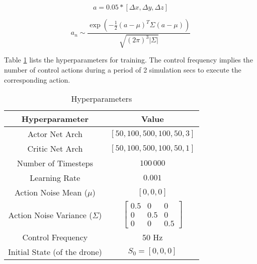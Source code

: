 \documentclass[../templateLTHtwocol.tex]{subfiles}
\begin{document}
\begin{equation}
	\label{nav_a_s:eq}
	a = 0.05 * [\Delta x, \Delta y, \Delta z]
\end{equation}

\begin{equation}
	\label{nav_a_n:eq}
	a_n \sim \frac{\exp(-\frac{1}{2} (a - \mu)^T \Sigma (a - \mu))}{\sqrt{(2 \pi)^3 |\Sigma|}}
\end{equation}

Table \ref{nav_rl_hp:table} lists the hyperparameters for training. The control frequency implies the number of control actions during a period of 2 simulation secs to execute the corresponding action.

\begin{table}[h]
\caption{Hyperparameters}
	\label{nav_rl_hp:table}
	\centering
	\begin{tabular}{|c|c|}
		\hline
		\textbf{Hyperparameter} & \textbf{Value} \\
		\hline \hline
		Actor Net Arch & $[50, 100, 500, 100, 50, 3]$ \\
		Critic Net Arch & $[50, 100, 500, 100, 50, 1]$ \\
		\hline
		Number of Timesteps & $100\,000$ \\
		Learning Rate & $0.001$ \\
		\hline
		Action Noise Mean ($\mu$) & $[0, 0, 0]$ \\
		Action Noise Variance ($\Sigma$) & $ \begin{bmatrix}
								   0.5 & 0 & 0 \\ 
								   0 & 0.5 & 0 \\ 
								   0 & 0 & 0.5
								 \end{bmatrix} $ \\
		\hline
		Control Frequency & 50 Hz \\
		\hline
		Initial State (of the drone) & $S_0 = [0, 0, 0]$ \\
		\hline
	\end{tabular}
\end{table}
\end{document}

